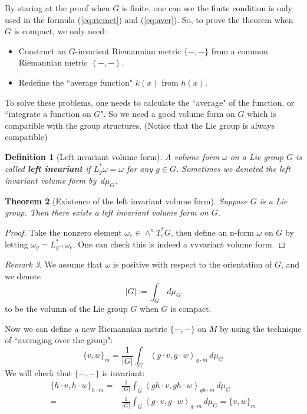 \documentclass[reqno,11pt]{amsart}
\numberwithin{equation}{section}
\theoremstyle{plain}
\newtheorem{theorem}{Theorem}[section]
\newtheorem{defn}[theorem]{Definition}
\theoremstyle{plain}
\numberwithin{equation}{section}
\theoremstyle{remark}
\newtheorem{remark}[theorem]{Remark}
\begin{document}
By staring at the proof when $G$ is finite, one can see the finite condition is only used in the formula (\ref{eq:riemet}) and (\ref{eq:aver}). So, to prove the theorem when $G$ is compact, we only need:
\begin{itemize}
	\item  Construct an $G$-invarient Riemannian metric $\{-,-\}$ from a common Riemannian metric
	$\left<-,-\right>$.
	\item Redefine the ``average function" $k(x)$ from $h(x)$.
\end{itemize}
To solve these problems, one needs to calculate the ``average" of the function, or ``integrate a function on $G$". So we need a good volume form on $G$ which is compatible with the group structures. (Notice that the Lie group is always compatible)
\begin{defn}[Left invariant volume form]
	A volume form $\omega$ on a Lie group $G$ is called \textbf{left invariant} if $L_g^*\omega=\omega$ for any $g \in G$.
	Sometimes we denoted the left invariant volume form by $\,d\mu_G$.
\end{defn}
\begin{theorem}[Existence of the left invariant volume form]
	Suppose $G$ is a Lie group. Then there exists a left invariant volume form on $G$.
\end{theorem}
\begin{proof}
	Take the nonzero element $\omega_e \in \wedge^nT_e^*G$, then define an n-form $\omega$ on $G$ by letting $\omega_g= L_{g^{-1}}^*\omega_e$. One can check this is indeed a vvvariant volume form.
\end{proof}
\begin{remark}
	We assume that $\omega$ is positive with respect to the orientation of $G$, and we denote
	$$|G|:=\int_G \,d\mu_G$$
	to be the volumn of the Lie group $G$ when $G$ is compact.
\end{remark}
Now we can define a new Riemannian metric $\{-,-\}$ on $M$ by using the technique of ``averaging over the group":
\begin{equation}
\{v,w\}_m=\frac{1}{|G|}\int_G \left<g \cdot v,g\cdot w\right>_{g\cdot m}\,d\mu_G
\label{eq:riemet2}
\end{equation}
We will check that $\{-,-\}$ is invariant:
\begin{equation*}
\begin{aligned}
\{h \cdot v,h \cdot w\}_{h \cdot m}=&\frac{1}{|G|}\int_G \left<gh \cdot v,gh\cdot w\right>_{gh\cdot m}\,d\mu_G\\
=&\frac{1}{|G|}\int_G \left<g \cdot v,g\cdot w\right>_{g\cdot m}\,d\mu_G=\{v,w\}_{m}
\end{aligned}
\end{equation*}
\end{document}
